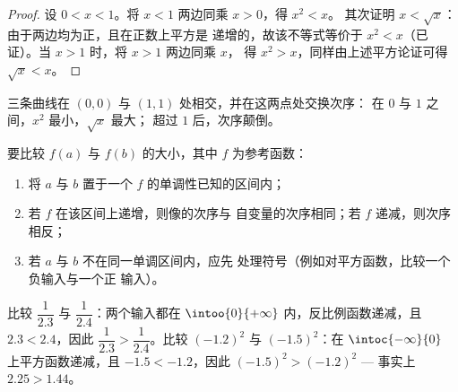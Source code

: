 \begin{proof}
设 $0 < x < 1$。将 $x < 1$ 两边同乘 $x > 0$，得 $x^2 < x$。
其次证明 $x < \sqrt x$：由于两边均为正，且在正数上平方是
递增的，故该不等式等价于
$x^2 < x$（已证）。当 $x > 1$ 时，将 $x > 1$ 两边同乘 $x$，
得 $x^2 > x$，同样由上述平方论证可得 $\sqrt x < x$。
\end{proof}

\begin{omfigure}

{\small 三条曲线在 $(0,0)$ 与 $(1,1)$ 处相交，并在这两点处交换次序：
在 $0$ 与 $1$ 之间，$x^2$ 最小，$\sqrt x$ 最大；
超过 $1$ 后，次序颠倒。}
\end{omfigure}

\begin{method}[比较像的大小]\label{met:g10:reffunc:compare}
要比较 $f(a)$ 与 $f(b)$ 的大小，其中 $f$ 为参考函数：
\begin{enumerate}
  \item 将 $a$ 与 $b$ 置于一个
        $f$ 的单调性已知的区间内；
  \item 若 $f$ 在该区间上递增，则像的次序与
        自变量的次序相同；若 $f$ 递减，则次序相反；
  \item 若 $a$ 与 $b$ 不在同一单调区间内，应先
        处理符号（例如对平方函数，比较一个负输入与一个正
        输入）。
\end{enumerate}
\end{method}

\begin{example}
比较 $\dfrac{1}{2.3}$ 与 $\dfrac{1}{2.4}$：两个输入都在
$\intoo{0}{+\infty}$ 内，反比例函数递减，且
$2.3 < 2.4$，因此 $\dfrac{1}{2.3} > \dfrac{1}{2.4}$。比较 $(-1.2)^2$
与 $(-1.5)^2$：在 $\intoc{-\infty}{0}$ 上平方函数递减，且
$-1.5 < -1.2$，因此 $(-1.5)^2 > (-1.2)^2$ --- 事实上 $2.25 > 1.44$。
\end{example}

